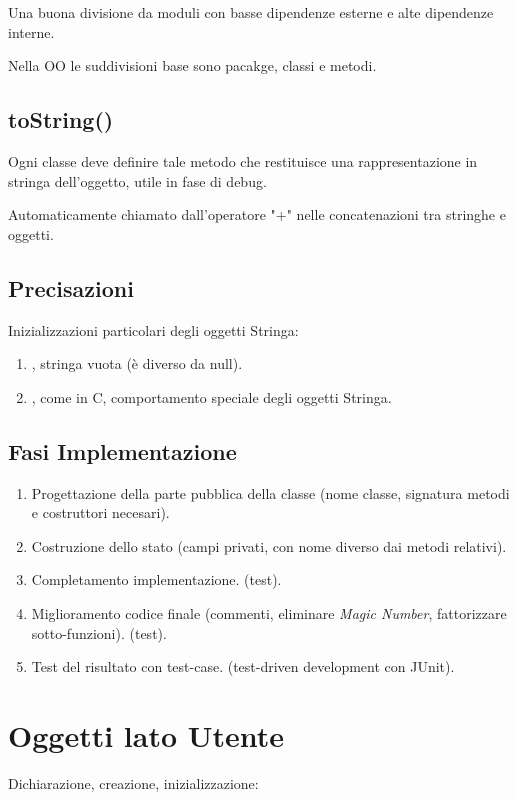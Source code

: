 Una buona divisione da moduli con basse dipendenze esterne e alte dipendenze interne.

Nella OO le suddivisioni base sono pacakge, classi e metodi.

\subsection{toString()}
Ogni classe deve definire tale metodo che restituisce una rappresentazione in stringa dell'oggetto, utile in fase di debug.

Automaticamente chiamato dall'operatore "+" nelle concatenazioni tra stringhe e oggetti.

\subsection{Precisazioni}
Inizializzazioni particolari degli oggetti Stringa:
\begin{enumerate}
	\item {}, stringa vuota (è diverso da null).
	\item {}, come in C, comportamento speciale degli oggetti Stringa.
\end{enumerate}

\subsection{Fasi Implementazione}
\begin{enumerate}
	\item Progettazione della parte pubblica della classe (nome classe, signatura metodi e costruttori necesari).
	\item Costruzione dello stato (campi privati, con nome diverso dai metodi relativi).
	\item Completamento implementazione. (test).
	\item Miglioramento codice finale (commenti, eliminare \textit{Magic Number}, fattorizzare sotto-funzioni). (test).
	\item Test del risultato con test-case. (test-driven development con JUnit).
\end{enumerate}

\section{Oggetti lato Utente}
Dichiarazione, creazione, inizializzazione:

